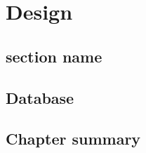 \chapter{Design}
\label{chap:Design}

\section{section name}
\label{sec:section label}

\section{Database}
\label{sec:Database}

\section{Chapter summary}
\label{sec:Chapter summary}
